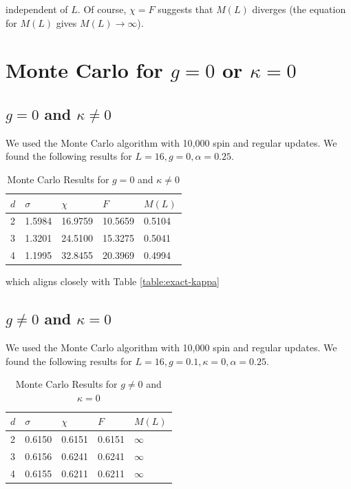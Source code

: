 \documentclass[12]{report}
\newcommand\0{\mathbf{0}}
\newcommand\<{\langle}
\renewcommand\>{\rangle}
\begin{document}
independent of $L$. Of course, $\chi = F$ suggests that $M(L)$ diverges (the equation for $M(L)$ gives $M(L) \rightarrow \infty$).

\section{Monte Carlo for $g=0$ or $\kappa = 0$}

\subsection{$g=0$ and $\kappa \neq 0$}

We used the Monte Carlo algorithm with 10,000 spin and regular updates. We found the following results for $L = 16, g = 0, \alpha = 0.25$.

\begin{table}[H]
\centering
\begin{tabular}{|l|l|l|l|l|}
\hline
$d$ & $\sigma$ & $\chi$ & $F$ & $M(L)$ \\ \hline
2   & 1.5984 & 16.9759 & 10.5659 & 0.5104 \\
3   & 1.3201 & 24.5100 & 15.3275 & 0.5041 \\
4   & 1.1995  &  32.8455 & 20.3969  & 0.4994 \\ \hline
\end{tabular}
\caption{Monte Carlo Results for $g=0$ and $\kappa \neq 0$}
\end{table}

which aligns closely with Table \ref{table:exact-kappa}

\subsection{$g\neq 0$ and $\kappa = 0$}

We used the Monte Carlo algorithm with 10,000 spin and regular updates. We found the following results for $L = 16, g = 0.1, \kappa = 0, \alpha = 0.25$.

\begin{table}[H]
\centering
\begin{tabular}{|l|l|l|l|l|}
\hline
$d$ & $\sigma$ & $\chi$ & $F$ & $M(L)$ \\ \hline
2   & 0.6150 & 0.6151 & 0.6151 & $\infty$ \\
3   & 0.6156 & 0.6241 & 0.6241 & $\infty$  \\
4   & 0.6155  & 0.6211 & 0.6211  & $\infty$ \\ \hline
\end{tabular}
\caption{Monte Carlo Results for $g\neq 0$ and $\kappa = 0$}
\end{table}
\end{document}
